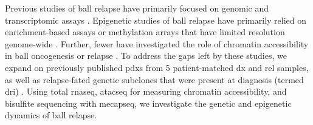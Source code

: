 Previous studies of \gls{ball} relapse have primarily focused on genomic and transcriptomic assays \cite{mullighanGenomicAnalysisClonal2008,maRiseFallSubclones2015,dobsonRelapseFatedLatentDiagnosis2020}.
Epigenetic studies of \gls{ball} relapse have primarily relied on enrichment-based assays or methylation arrays that have limited resolution genome-wide \cite{hoganIntegratedGenomicAnalysis2011,nordlundGenomewideSignaturesDifferential2013,leeEpigeneticRemodelingBcell2015}.
Further, fewer have investigated the role of chromatin accessibility in \gls{ball} oncogenesis or relapse \cite{diedrichProfilingChromatinAccessibility2021}.
To address the gaps left by these studies, we expand on previously published \glspl{pdx} from 5 patient-matched \gls{dx} and \gls{rel} samples, as well as relapse-fated genetic subclones that were present at diagnosis (termed \gls{dri}) \cite{dobsonRelapseFatedLatentDiagnosis2020}.
Using total \gls{rnaseq}, \gls{atacseq} for measuring chromatin accessibility, and  bisulfite sequencing with \gls{mecapseq}, we investigate the genetic and epigenetic dynamics of \gls{ball} relapse.
